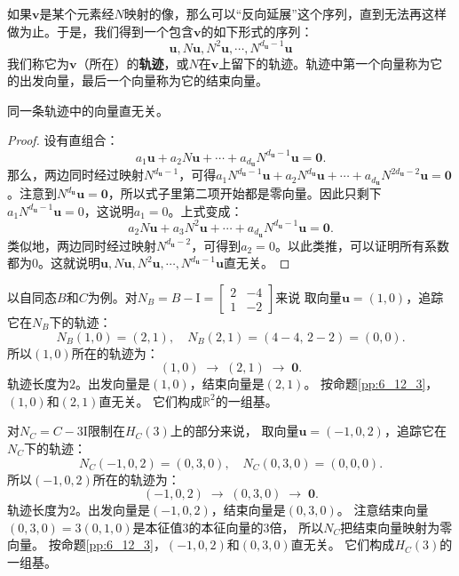 \documentclass[12pt,UTF8]{ctexbook}
\begin{document}
如果$\mathbf{v}$是某个元素经$N$映射的像，那么可以“反向延展”这个序列，直到无法再这样做为止。于是，我们得到一个包含$\mathbf{v}$的如下形式的序列：
$$ \mathbf{u}, N\mathbf{u}, N^2 \mathbf{u}, \cdots , N^{d_\mathbf{u} - 1} \mathbf{u} $$
我们称它为$\mathbf{v}$（所在）的\textbf{轨迹}，或$N$在$\mathbf{v}$上留下的轨迹。轨迹中第一个向量称为它的出发向量，最后一个向量称为它的结束向量。
\begin{pp}\label{pp:6_12_3}
    同一条轨迹中的向量直无关。
\end{pp}
\begin{proof} %
设有直组合：
$$ a_1 \mathbf{u} + a_2 N\mathbf{u} +\cdots + a_{d_\mathbf{u}} N^{d_\mathbf{u} - 1} \mathbf{u} = \mathbf{0}.$$
那么，两边同时经过映射$N^{d_\mathbf{u} - 1}$，可得$a_1 N^{d_\mathbf{u} - 1}\mathbf{u} + a_2 N^{d_\mathbf{u}}\mathbf{u} +\cdots + a_{d_\mathbf{u}} N^{2d_\mathbf{u} - 2} \mathbf{u} = \mathbf{0}$。注意到$N^{d_\mathbf{u}}\mathbf{u}= \mathbf{0}$，所以式子里第二项开始都是零向量。因此只剩下$a_1 N^{d_\mathbf{u} - 1}\mathbf{u} = 0$，这说明$a_1 = 0$。上式变成：
$$ a_2 N\mathbf{u} + a_3 N^2\mathbf{u} +\cdots + a_{d_\mathbf{u}} N^{d_\mathbf{u} - 1} \mathbf{u} = \mathbf{0}. $$
类似地，两边同时经过映射$N^{d_\mathbf{u} - 2}$，可得到$a_2 = 0$。以此类推，可以证明所有系数都为0。这就说明$\mathbf{u}, N\mathbf{u}, N^2 \mathbf{u}, \cdots , N^{d_\mathbf{u} - 1} \mathbf{u}$直无关。

\end{proof}

以自同态$B$和$C$为例。对$N_B = B - \mathrm{I} = \begin{bmatrix} 2 & -4 \\ 1 & -2 \end{bmatrix}$来说
取向量$\mathbf{u} = (1,0)$，追踪它在$N_B$下的轨迹：
$$
N_B(1,0) = (2, 1), \quad N_B(2,1) = (4-4,\, 2-2) = (0,0).
$$
所以$(1,0)$所在的轨迹为：
$$
(1,0) \;\longrightarrow\; (2,1) \;\longrightarrow\; \mathbf{0}.
$$
轨迹长度为$2$。出发向量是$(1,0)$，结束向量是$(2,1)$。
按命题\ref{pp:6_12_3}，$(1,0)$和$(2,1)$直无关。
它们构成$\mathbb{R}^2$的一组基。

对$N_C = C - 3\mathrm{I}$限制在$H_C(3)$上的部分来说，
取向量$\mathbf{u} = (-1, 0, 2)$，追踪它在$N_C$下的轨迹：
$$
N_C(-1,0,2) = (0, 3, 0), \quad N_C(0,3,0) = (0, 0, 0).
$$
所以$(-1,0,2)$所在的轨迹为：
$$
(-1,0,2) \;\longrightarrow\; (0,3,0) \;\longrightarrow\; \mathbf{0}.
$$
轨迹长度为$2$。出发向量是$(-1,0,2)$，结束向量是$(0,3,0)$。
注意结束向量$(0,3,0) = 3(0,1,0)$是本征值$3$的本征向量的$3$倍，
所以$N_C$把结束向量映射为零向量。
按命题\ref{pp:6_12_3}，$(-1,0,2)$和$(0,3,0)$直无关。
它们构成$H_C(3)$的一组基。
\end{document}
